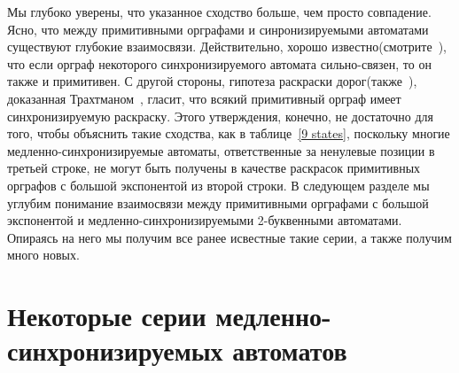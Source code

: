 \documentclass[11pt]{article}
\newcommand{\sa}{synchronizing automata}
\newcommand{\san}{synchronizing automaton}
\begin{document}
Мы глубоко уверены, что указанное сходство больше, чем просто совпадение.
Ясно, что между примитивными орграфами и синронизируемыми автоматами
существуют глубокие взаимосвязи. Действительно, хорошо известно(смотрите~\cite{AGW}),
что если орграф некоторого синхронизируемого автомата сильно-связен, 
то он также и примитивен. С другой стороны, гипотеза раскраски дорог(также~\cite{AGW}), 
доказанная Трахтманом~\cite{Tr09}, гласит, что всякий примитивный орграф имеет 
синхронизируемую раскраску. Этого утверждения, конечно, не достаточно для того,
чтобы объяснить такие сходства, как в таблице~\ref{9 states}, поскольку многие 
медленно-синхронизируемые автоматы, ответственные за ненулевые позиции в третьей
строке, не могут быть получены в качестве раскрасок примитивных орграфов с большой
экспонентой из второй строки. В следующем разделе мы углубим понимание взаимосвязи
между примитивными орграфами с большой экспонентой и медленно-синхронизируемыми
2-буквенными автоматами. Опираясь на него мы получим все ранее исвестные такие серии,
а также получим много новых.



\section{Некоторые серии медленно-синхронизируемых автоматов}
\label{sss}

\end{document}
